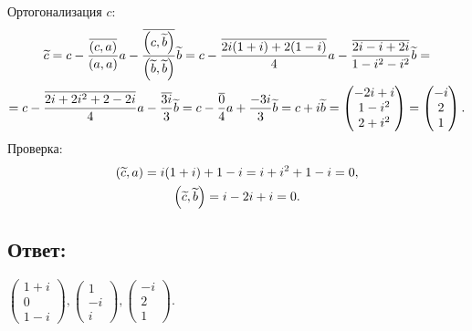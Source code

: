 \documentclass[12pt]{article}
\begin{document}
    Ортогонализация $c$:
    \begin{multline*}
        \widetilde{c}
        = c - \frac{\overline{\left ( c, a \right )}}{\left ( a, a \right )} a - \frac{\overline{\left ( c, \widetilde{b} \right )}}{\left ( \widetilde{b}, \widetilde{b} \right )} \widetilde{b}
        = c - \frac{\overline{2i (1+i) + 2 (1-i)}}{4} a - \frac{\overline{2i - i + 2i}}{1 - i^2 - i^2} \widetilde{b} = \\
        = c - \frac{\overline{2i + 2i^2 + 2 - 2i}}{4} a - \frac{\overline{3i}}{3} \widetilde{b}
        = c - \frac{\overline{0}}{4} a + \frac{-3i}{3} \widetilde{b}
        = c + i \widetilde{b}
        =
        \begin{pmatrix}
            -2i + i \\
            1 - i^2 \\
            2 + i^2
        \end{pmatrix}
        =
        \begin{pmatrix}
            -i \\
            2  \\
            1
        \end{pmatrix}
        .
    \end{multline*}
    Проверка:
    \begin{gather*}
        \left ( \widetilde{c}, a \right ) = i ( 1 + i ) + 1 - i = i + i^2 + 1 - i = 0 , \\
        \left ( \widetilde{c}, \widetilde{b} \right ) = i - 2i + i = 0 .
    \end{gather*}

    \subsection*{Ответ:}
    $
    \begin{pmatrix}
        1 + i \\
        0     \\
        1 - i
    \end{pmatrix},
    \begin{pmatrix}
        1  \\
        -i \\
        i
    \end{pmatrix},
    \begin{pmatrix}
        -i \\
        2  \\
        1
    \end{pmatrix}
    $.
\end{document}
